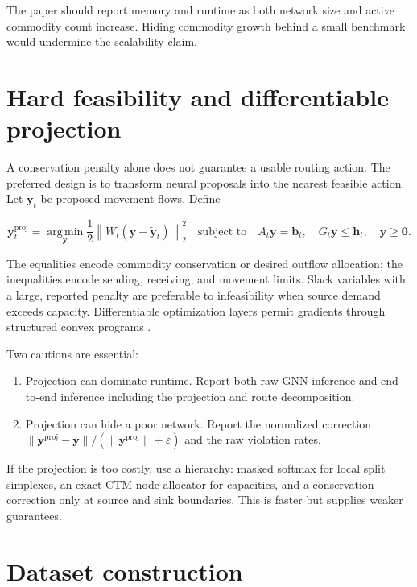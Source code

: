 \documentclass[11pt]{article}
\newcommand{\argmin}{\operatorname*{arg\,min}}
\newcommand{\vect}[1]{\bm{#1}}
\begin{document}
The paper should report memory and runtime as both network size and active commodity
count increase.  Hiding commodity growth behind a small benchmark would undermine the
scalability claim.

\section{Hard feasibility and differentiable projection}

A conservation penalty alone does not guarantee a usable routing action.  The preferred
design is to transform neural proposals into the nearest feasible action.  Let
\(\widetilde{\vect{y}}_t\) be proposed movement flows.  Define

\begin{equation}
  \vect{y}_t^{\mathrm{proj}}
  = \argmin_{\vect{y}}
      \frac{1}{2}
      \left\|W_t(\vect{y}-\widetilde{\vect{y}}_t)\right\|_2^2
  \quad\text{subject to}\quad
  A_t\vect{y}=\vect{b}_t,
  \quad
  G_t\vect{y}\leq\vect{h}_t,
  \quad
  \vect{y}\geq\vect{0}.
  \label{eq:projection}
\end{equation}

The equalities encode commodity conservation or desired outflow allocation; the
inequalities encode sending, receiving, and movement limits.  Slack variables with a
large, reported penalty are preferable to infeasibility when source demand exceeds
capacity.  Differentiable optimization layers permit gradients through structured
convex programs \citep{amos2017,agrawal2019}.

Two cautions are essential:

\begin{enumerate}[leftmargin=1.5em]
  \item Projection can dominate runtime.  Report both raw GNN inference and end-to-end
  inference including the projection and route decomposition.
  \item Projection can hide a poor network.  Report the normalized correction
  \(
  \|\vect{y}^{\mathrm{proj}}-\widetilde{\vect{y}}\|/
  (\|\vect{y}^{\mathrm{proj}}\|+\varepsilon)
  \)
  and the raw violation rates.
\end{enumerate}

If the projection is too costly, use a hierarchy: masked softmax for local split
simplexes, an exact CTM node allocator for capacities, and a conservation correction
only at source and sink boundaries.  This is faster but supplies weaker guarantees.

\section{Dataset construction}
\end{document}
